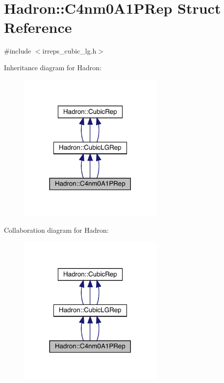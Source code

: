 \hypertarget{structHadron_1_1C4nm0A1PRep}{}\section{Hadron\+:\+:C4nm0\+A1\+P\+Rep Struct Reference}
\label{structHadron_1_1C4nm0A1PRep}


{\ttfamily \#include $<$irreps\+\_\+cubic\+\_\+lg.\+h$>$}



Inheritance diagram for Hadron\+:
\nopagebreak
\begin{figure}[H]
\begin{center}
\leavevmode
\includegraphics[width=204pt]{d7/d8a/structHadron_1_1C4nm0A1PRep__inherit__graph}
\end{center}
\end{figure}


Collaboration diagram for Hadron\+:
\nopagebreak
\begin{figure}[H]
\begin{center}
\leavevmode
\includegraphics[width=204pt]{d2/d39/structHadron_1_1C4nm0A1PRep__coll__graph}
\end{center}
\end{figure}
